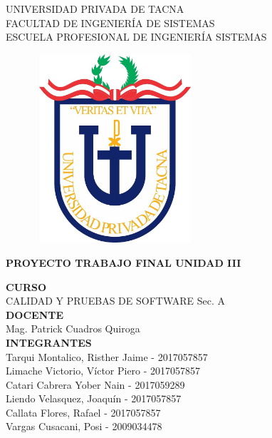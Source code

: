 \documentclass[12pt,a4paper,oneside]{book}
\begin{document}
	
	\thispagestyle{empty} 
	
	\begin{center} 
		\LARGE{UNIVERSIDAD PRIVADA DE TACNA} \\[0.5cm] 
		\Large{FACULTAD DE INGENIERÍA DE SISTEMAS}\\[0.5cm] 
		\large{ ESCUELA PROFESIONAL DE INGENIERÍA SISTEMAS} 
	\end{center}
	
	\begin{figure}[htb]
		\centering \includegraphics[width=6cm, height=7cm]{img/uptlogo.jpg}
	\end{figure}
	
	\begin{center} 
			\LARGE{\bf PROYECTO TRABAJO FINAL \newline UNIDAD III }\\ \vspace{.25cm}
		
	\end{center}

	\begin{center} 
		
		\textbf {CURSO}\\ 
		\large CALIDAD Y PRUEBAS DE SOFTWARE Sec. A \\
		
		\textbf {DOCENTE}\\
		\large Mag. Patrick Cuadros Quiroga\\
	
		\textbf {INTEGRANTES}\\
		\large Tarqui Montalico, Risther Jaime - 2017057857 \\
		\large Limache Victorio, V\'ictor Piero - 2017057857 \\
		\large Catari Cabrera Yober Nain - 2017059289 \\
		\large Liendo Velasquez, Joaqu\'in - 2017057857 \\
		\large Callata Flores, Rafael - 2017057857 \\
		\large Vargas Cusacani, Posi - 2009034478 \\
		
	\end{center}
\end{document}
